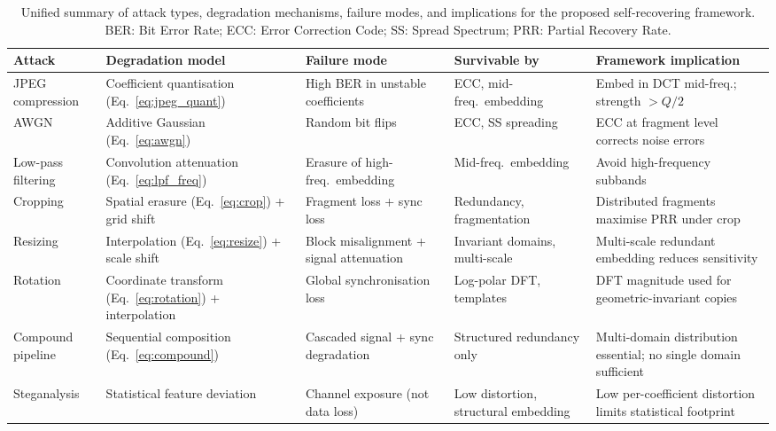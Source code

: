 \documentclass[12pt,a4paper,oneside]{report}
\begin{document}
	\begin{table}[htbp]
		\centering
		\caption{Unified summary of attack types, degradation mechanisms, failure modes, and
			implications for the proposed self-recovering framework. BER: Bit Error Rate;
			ECC: Error Correction Code; SS: Spread Spectrum; PRR: Partial Recovery Rate.}
		\label{tab:attack_summary}
		\renewcommand{\arraystretch}{1.35}
		\small
		\begin{tabular}{@{} p{2.1cm} p{2.5cm} p{2.4cm} p{2.0cm} p{3.4cm} @{}}
			\toprule
			\textbf{Attack} & \textbf{Degradation model} & \textbf{Failure mode} &
			\textbf{Survivable by} & \textbf{Framework implication} \\
			\midrule
			JPEG compression
			& Coefficient quantisation (Eq.~\ref{eq:jpeg_quant})
			& High BER in unstable coefficients
			& ECC, mid-freq.\ embedding
			& Embed in DCT mid-freq.; strength $> Q/2$ \\
			\midrule
			AWGN
			& Additive Gaussian (Eq.~\ref{eq:awgn})
			& Random bit flips
			& ECC, SS spreading
			& ECC at fragment level corrects noise errors \\
			\midrule
			Low-pass filtering
			& Convolution attenuation (Eq.~\ref{eq:lpf_freq})
			& Erasure of high-freq.\ embedding
			& Mid-freq.\ embedding
			& Avoid high-frequency subbands \\
			\midrule
			Cropping
			& Spatial erasure (Eq.~\ref{eq:crop}) + grid shift
			& Fragment loss + sync loss
			& Redundancy, fragmentation
			& Distributed fragments maximise PRR under crop \\
			\midrule
			Resizing
			& Interpolation (Eq.~\ref{eq:resize}) + scale shift
			& Block misalignment + signal attenuation
			& Invariant domains, multi-scale
			& Multi-scale redundant embedding reduces sensitivity \\
			\midrule
			Rotation
			& Coordinate transform (Eq.~\ref{eq:rotation}) + interpolation
			& Global synchronisation loss
			& Log-polar DFT, templates
			& DFT magnitude used for geometric-invariant copies \\
			\midrule
			Compound pipeline
			& Sequential composition (Eq.~\ref{eq:compound})
			& Cascaded signal + sync degradation
			& Structured redundancy only
			& Multi-domain distribution essential; no single domain sufficient \\
			\midrule
			Steganalysis
			& Statistical feature deviation
			& Channel exposure (not data loss)
			& Low distortion, structural embedding
			& Low per-coefficient distortion limits statistical footprint \\
			\bottomrule
		\end{tabular}
	\end{table}
	
\end{document}
